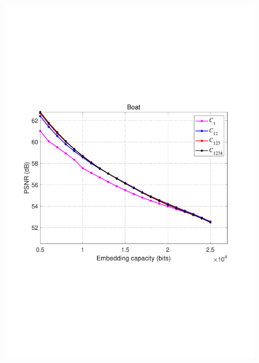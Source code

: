 \documentclass[review,3p,10pt,sort&compress]{elsarticle}
\begin{document}
\begin{figure}
{\begin{minipage}[t]{0.45\linewidth}
\includegraphics[width=1\textwidth]{figures/Result/size/Boat.pdf}
\end{minipage}
}


\end{figure}
\end{document}
